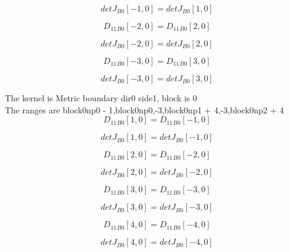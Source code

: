 \documentclass{article}
\begin{document}
\begin{dmath}{detJ{_{B0}}}[{-1,0}] = {detJ{_{B0}}}[{1,0}]\end{dmath}

\begin{dmath}{D_{11}{_{B0}}}[{-2,0}] = {D_{11}{_{B0}}}[{2,0}]\end{dmath}

\begin{dmath}{detJ{_{B0}}}[{-2,0}] = {detJ{_{B0}}}[{2,0}]\end{dmath}

\begin{dmath}{D_{11}{_{B0}}}[{-3,0}] = {D_{11}{_{B0}}}[{3,0}]\end{dmath}

\begin{dmath}{detJ{_{B0}}}[{-3,0}] = {detJ{_{B0}}}[{3,0}]\end{dmath}

\noindent The kernel is Metric boundary dir0 side1, block is 0\\\noindent The ranges are block0np0 - 1,block0np0,-3,block0np1 + 4,-3,block0np2 + 4\\\begin{dmath}{D_{11}{_{B0}}}[{1,0}] = {D_{11}{_{B0}}}[{-1,0}]\end{dmath}

\begin{dmath}{detJ{_{B0}}}[{1,0}] = {detJ{_{B0}}}[{-1,0}]\end{dmath}

\begin{dmath}{D_{11}{_{B0}}}[{2,0}] = {D_{11}{_{B0}}}[{-2,0}]\end{dmath}

\begin{dmath}{detJ{_{B0}}}[{2,0}] = {detJ{_{B0}}}[{-2,0}]\end{dmath}

\begin{dmath}{D_{11}{_{B0}}}[{3,0}] = {D_{11}{_{B0}}}[{-3,0}]\end{dmath}

\begin{dmath}{detJ{_{B0}}}[{3,0}] = {detJ{_{B0}}}[{-3,0}]\end{dmath}

\begin{dmath}{D_{11}{_{B0}}}[{4,0}] = {D_{11}{_{B0}}}[{-4,0}]\end{dmath}

\begin{dmath}{detJ{_{B0}}}[{4,0}] = {detJ{_{B0}}}[{-4,0}]\end{dmath}
\end{document}
